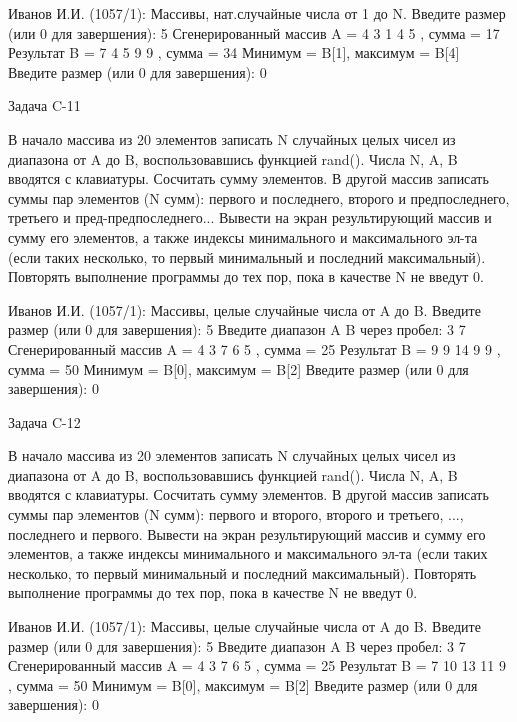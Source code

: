 Иванов И.И. (1057/1): Массивы, нат.случайные числа от 1 до N.
Введите размер (или 0 для завершения): 5
Сгенерированный массив A = { 4 3 1 4 5 }, сумма = 17
Результат B = { 7 4 5 9 9 }, сумма = 34
Минимум = B[1], максимум = B[4]
Введите размер (или 0 для завершения): 0


Задача C-11

В начало массива из 20 элементов записать N случайных целых чисел из диапазона
от A до B, воспользовавшись функцией rand(). Числа N, A, B вводятся с
клавиатуры. Сосчитать сумму элементов. В другой массив записать суммы пар
элементов (N сумм): первого и последнего, второго и предпоследнего, третьего и
пред-предпоследнего... Вывести на экран результирующий массив и сумму его
элементов, а также индексы минимального и максимального эл-та (если таких
несколько, то первый минимальный и последний максимальный). Повторять
выполнение программы до тех пор, пока в качестве N не введут 0.

Иванов И.И. (1057/1): Массивы, целые случайные числа от A до B.
Введите размер (или 0 для завершения): 5
Введите диапазон A B через пробел: 3 7
Сгенерированный массив A = { 4 3 7 6 5 }, сумма = 25
Результат B = { 9 9 14 9 9 }, сумма = 50
Минимум = B[0], максимум = B[2]
Введите размер (или 0 для завершения): 0


Задача C-12

В начало массива из 20 элементов записать N случайных целых чисел из диапазона
от A до B, воспользовавшись функцией rand(). Числа N, A, B вводятся с
клавиатуры. Сосчитать сумму элементов. В другой массив записать суммы пар
элементов (N сумм): первого и второго, второго и третьего, ..., последнего и
первого. Вывести на экран результирующий массив и сумму его элементов, а также
индексы минимального и максимального эл-та (если таких несколько, то первый
минимальный и последний максимальный). Повторять выполнение программы до тех
пор, пока в качестве N не введут 0.

Иванов И.И. (1057/1): Массивы, целые случайные числа от A до B.
Введите размер (или 0 для завершения): 5
Введите диапазон A B через пробел: 3 7
Сгенерированный массив A = { 4 3 7 6 5 }, сумма = 25
Результат B = { 7 10 13 11 9 }, сумма = 50
Минимум = B[0], максимум = B[2]
Введите размер (или 0 для завершения): 0


